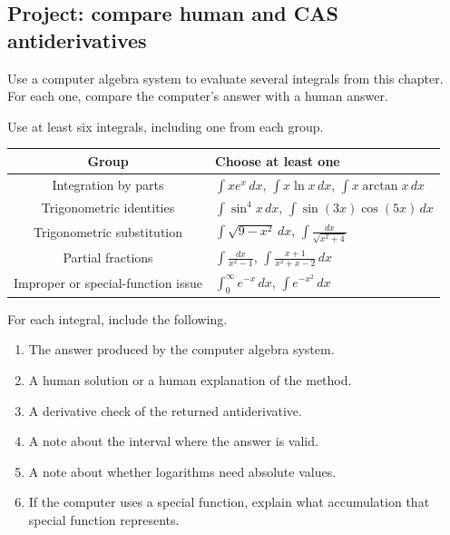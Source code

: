 \subsection{Project: compare human and CAS antiderivatives}
\label{subsec:project-compare-human-cas}

Use a computer algebra system to evaluate several integrals from this chapter.  For each
one, compare the computer's answer with a human answer.

Use at least six integrals, including one from each group.

\begin{center}
\begin{tabular}{c|p{}}
\textbf{Group} & \textbf{Choose at least one} \\ \hline
Integration by parts & \(\displaystyle \int x e^x\,dx\), \(\displaystyle \int x\ln x\,dx\), \(\displaystyle \int x\arctan x\,dx\) \\[6pt]
Trigonometric identities & \(\displaystyle \int \sin^4x\,dx\), \(\displaystyle \int \sin(3x)\cos(5x)\,dx\) \\[6pt]
Trigonometric substitution & \(\displaystyle \int \sqrt{9-x^2}\,dx\), \(\displaystyle \int \frac{dx}{\sqrt{x^2+4}}\) \\[6pt]
Partial fractions & \(\displaystyle \int \frac{dx}{x^2-1}\), \(\displaystyle \int \frac{x+1}{x^2+x-2}\,dx\) \\[6pt]
Improper or special-function issue & \(\displaystyle \int_0^\infty e^{-x}\,dx\), \(\displaystyle \int e^{-x^2}\,dx\)
\end{tabular}
\end{center}

For each integral, include the following.

\begin{enumerate}
\item The answer produced by the computer algebra system.

\item A human solution or a human explanation of the method.

\item A derivative check of the returned antiderivative.

\item A note about the interval where the answer is valid.

\item A note about whether logarithms need absolute values.

\item If the computer uses a special function, explain what accumulation that special
function represents.
\end{enumerate}

